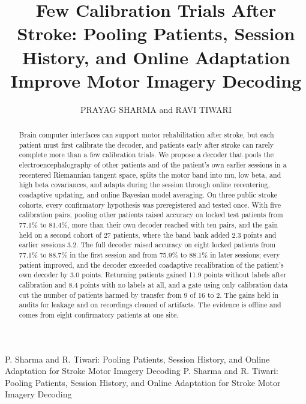 \documentclass{ieeeaccess}
\begin{document}

\title{Few Calibration Trials After Stroke: Pooling Patients, Session History, and Online Adaptation Improve Motor Imagery Decoding}
\author{\uppercase{Prayag Sharma} and \uppercase{Ravi Tiwari}}
\address[1]{School of Computer Science and Engineering (SCOPE), Vellore Institute of Technology (VIT), Chennai, Tamil Nadu, India (e-mail: prayag.sharma2024@vitstudent.ac.in)}
\address[2]{School of Electronics Engineering (SENSE), Vellore Institute of Technology (VIT), Chennai, Tamil Nadu, India (e-mail: ravi.tiwari@vit.ac.in)}

\markboth
{P. Sharma and R. Tiwari: Pooling Patients, Session History, and Online Adaptation for Stroke Motor Imagery Decoding}
{P. Sharma and R. Tiwari: Pooling Patients, Session History, and Online Adaptation for Stroke Motor Imagery Decoding}


\begin{abstract}
Brain computer interfaces can support motor rehabilitation after stroke, but each patient must first calibrate the decoder, and patients early after stroke can rarely complete more than a few calibration trials. We propose a decoder that pools the electroencephalography of other patients and of the patient's own earlier sessions in a recentered Riemannian tangent space, splits the motor band into mu, low beta, and high beta covariances, and adapts during the session through online recentering, coadaptive updating, and online Bayesian model averaging. On three public stroke cohorts, every confirmatory hypothesis was preregistered and tested once. With five calibration pairs, pooling other patients raised accuracy on locked test patients from 77.1\% to 81.4\%, more than their own decoder reached with ten pairs, and the gain held on a second cohort of 27 patients, where the band bank added 2.3 points and earlier sessions 3.2. The full decoder raised accuracy on eight locked patients from 77.1\% to 88.7\% in the first session and from 75.9\% to 88.1\% in later sessions; every patient improved, and the decoder exceeded coadaptive recalibration of the patient's own decoder by 3.0 points. Returning patients gained 11.9 points without labels after calibration and 8.4 points with no labels at all, and a gate using only calibration data cut the number of patients harmed by transfer from 9 of 16 to 2. The gains held in audits for leakage and on recordings cleaned of artifacts. The evidence is offline and comes from eight confirmatory patients at one site.
\end{abstract}
\end{document}
